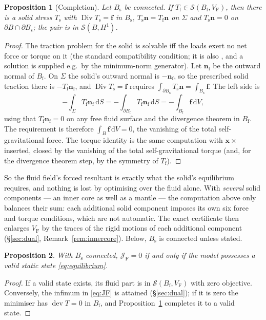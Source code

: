 \documentclass[11pt]{article}
\newtheorem{proposition}{Proposition}
\newcommand{\Jf}{\mathscr{J}}  %
\newcommand{\Bs}{B_{\mathrm{s}}}
\newcommand{\Bf}{B_{\mathrm{f}}}
\newcommand{\bx}{\mathbf{x}}
\newcommand{\bn}{\mathbf{n}}
\newcommand{\bff}{\mathbf{f}}
\newcommand{\dS}{\,\mathrm{d}S}
\newcommand{\dV}{\,\mathrm{d}V}
\newcommand{\dev}{\operatorname{dev}}
\newcommand{\Div}{\operatorname{Div}}
\newcommand{\JF}{\Jf _{\mathrm{F}}}
\begin{document}
\begin{proposition}[Completion]\label{prop:completion}
Let $\Bs$ be connected. If $T_{\mathrm{f}} \in \mathcal{S}(\Bf,
V_{\mathrm{F}})$, then there is a solid stress $T_{\mathrm{s}}$ with
$\Div T_{\mathrm{s}} = \bff$ in $\Bs$, $T_{\mathrm{s}}\bn =
T_{\mathrm{f}}\bn$ on $\Sigma$ and $T_{\mathrm{s}}\bn = 0$ on
$\partial B \cap \partial\Bs$; the pair is in $\mathcal{S}(B, H^1)$.
\end{proposition}
\begin{proof}
The traction problem for the solid is solvable iff the loads exert no
net force or torque on it (the standard compatibility condition; it is
also \cite[eq.~58]{AW10}, and a solution is supplied e.g.\ by the
minimum-norm generator). Let $\bn_{\mathrm{f}}$ be the outward normal of
$\Bf$. On $\Sigma$ the solid's outward normal is $-\bn_{\mathrm{f}}$, so
the prescribed solid traction there is $-T_{\mathrm{f}}\bn_{\mathrm{f}}$,
and $\Div T_{\mathrm{s}} = \bff$ requires $\int_{\partial\Bs}
T_{\mathrm{s}}\bn = \int_{\Bs}\bff$. The left side is
\begin{equation}
  -\int_{\Sigma} T_{\mathrm{f}}\bn_{\mathrm{f}}\dS
  = -\int_{\partial\Bf} T_{\mathrm{f}}\bn_{\mathrm{f}}\dS
  = -\int_{\Bf}\bff\dV ,
\end{equation}
using that $T_{\mathrm{f}}\bn_{\mathrm{f}} = 0$ on any free fluid surface
and the divergence theorem in $\Bf$. The requirement is therefore
$\int_B\bff\dV = 0$, the vanishing of the total self-gravitational
force. The torque identity is the same computation
with $\bx\times$ inserted, closed by the vanishing of the total
self-gravitational torque (and, for the divergence theorem step, by the
symmetry of $T_{\mathrm{f}}$).
\end{proof}

So the fluid field's forced resultant is exactly what the solid's
equilibrium requires, and nothing is lost by optimising over the fluid
alone. With \emph{several} solid components --- an inner core as well
as a mantle --- the computation above only balances their sum: each
additional solid component imposes its own six force and torque
conditions, which are not automatic. The exact certificate then
enlarges $V_{\mathrm{F}}$ by the traces of the rigid motions of each
additional component (\S\ref{sec:dual}, Remark~\ref{rem:innercore}).
Below, $\Bs$ is connected unless stated.

\begin{proposition}\label{prop:JFexact}
With $\Bs$ connected, $\JF = 0$ if and only if the model possesses a
valid static state \eqref{eq:equilibrium}.
\end{proposition}
\begin{proof}
If a valid state exists, its fluid part is in $\mathcal{S}(\Bf,
V_{\mathrm{F}})$ with zero objective. Conversely, the infimum in
\eqref{eq:JF} is attained (\S\ref{sec:dual}); if it is zero the
minimiser has $\dev T = 0$ in $\Bf$, and Proposition~\ref{prop:completion}
completes it to a valid state.
\end{proof}
\end{document}
